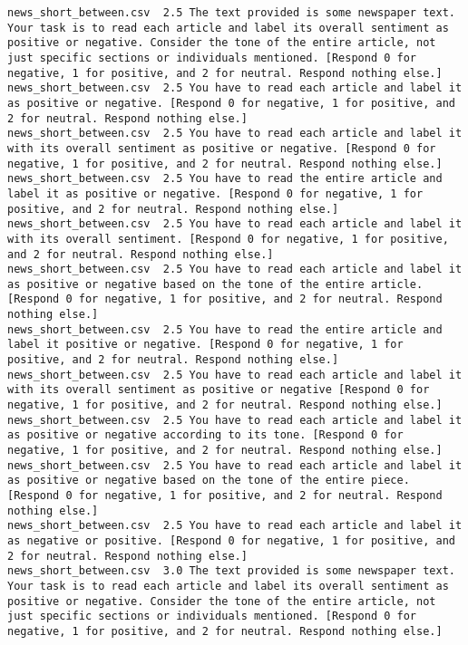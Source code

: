 \begin{lstlisting}
news_short_between.csv	2.5	The text provided is some newspaper text. Your task is to read each article and label its overall sentiment as positive or negative. Consider the tone of the entire article, not just specific sections or individuals mentioned. [Respond 0 for negative, 1 for positive, and 2 for neutral. Respond nothing else.]
news_short_between.csv	2.5	You have to read each article and label it as positive or negative. [Respond 0 for negative, 1 for positive, and 2 for neutral. Respond nothing else.]
news_short_between.csv	2.5	You have to read each article and label it with its overall sentiment as positive or negative. [Respond 0 for negative, 1 for positive, and 2 for neutral. Respond nothing else.]
news_short_between.csv	2.5	You have to read the entire article and label it as positive or negative. [Respond 0 for negative, 1 for positive, and 2 for neutral. Respond nothing else.]
news_short_between.csv	2.5	You have to read each article and label it with its overall sentiment. [Respond 0 for negative, 1 for positive, and 2 for neutral. Respond nothing else.]
news_short_between.csv	2.5	You have to read each article and label it as positive or negative based on the tone of the entire article. [Respond 0 for negative, 1 for positive, and 2 for neutral. Respond nothing else.]
news_short_between.csv	2.5	You have to read the entire article and label it positive or negative. [Respond 0 for negative, 1 for positive, and 2 for neutral. Respond nothing else.]
news_short_between.csv	2.5	You have to read each article and label it with its overall sentiment as positive or negative [Respond 0 for negative, 1 for positive, and 2 for neutral. Respond nothing else.]
news_short_between.csv	2.5	You have to read each article and label it as positive or negative according to its tone. [Respond 0 for negative, 1 for positive, and 2 for neutral. Respond nothing else.]
news_short_between.csv	2.5	You have to read each article and label it as positive or negative based on the tone of the entire piece. [Respond 0 for negative, 1 for positive, and 2 for neutral. Respond nothing else.]
news_short_between.csv	2.5	You have to read each article and label it as negative or positive. [Respond 0 for negative, 1 for positive, and 2 for neutral. Respond nothing else.]
news_short_between.csv	3.0	The text provided is some newspaper text. Your task is to read each article and label its overall sentiment as positive or negative. Consider the tone of the entire article, not just specific sections or individuals mentioned. [Respond 0 for negative, 1 for positive, and 2 for neutral. Respond nothing else.]

\end{lstlisting}
